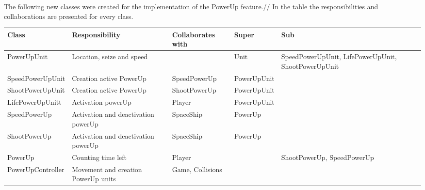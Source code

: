 \documentclass[10pt]{article}
\begin{document}
The following new classes were created for the implementation of the PowerUp feature.//
In the table the responsibilities and collaborations are presented for every class.
\begin{center}
    \begin{tabular}{ | p{3cm} | p{4cm} | p{3cm} | p{2cm} | p{3cm} |}
  \hline
    Class & Responsibility & Collaborates with & Super & Sub \\ \hline
   PowerUpUnit & Location, seize and speed  &  & Unit & SpeedPowerUpUnit, LifePowerUpUnit, ShootPowerUpUnit \\ \hline
   SpeedPowerUpUnit & Creation active PowerUp  & SpeedPowerUp & PowerUpUnit & \\ \hline
  ShootPowerUpUnit & Creation active PowerUp & ShootPowerUp & PowerUpUnit & \\ \hline
  LifePowerUpUnitt & Activation powerUp & Player  & PowerUpUnit & \\ \hline
   SpeedPowerUp & Activation and deactivation powerUp & SpaceShip & PowerUp & \\ \hline
  ShootPowerUp & Activation and deactivation powerUp & SpaceShip & PowerUp &  \\  \hline
   PowerUp & Counting time left  & Player &  & ShootPowerUp, SpeedPowerUp  \\  \hline
   PowerUpController & Movement and creation PowerUp units & Game, Collisions &  &  \\  \hline
 
    \end{tabular}
\end{center}
\end{document}
